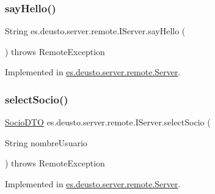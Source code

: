 \mbox{\label{interfacees_1_1deusto_1_1server_1_1remote_1_1_i_server_a9a2ee16746baf359dc7ac1fc4437eee8}} 
\subsubsection{\texorpdfstring{sayHello()}{sayHello()}}
{\footnotesize\ttfamily String es.\+deusto.\+server.\+remote.\+I\+Server.\+say\+Hello (\begin{DoxyParamCaption}{ }\end{DoxyParamCaption}) throws Remote\+Exception}



Implemented in \mbox{\hyperlink{classes_1_1deusto_1_1server_1_1remote_1_1_server_a37ccd2be0b3fbf0a80b356f132eca048}{es.\+deusto.\+server.\+remote.\+Server}}.

\mbox{\label{interfacees_1_1deusto_1_1server_1_1remote_1_1_i_server_a5268c08f2dd59d8ebc3864f7345c12f3}} 
\subsubsection{\texorpdfstring{selectSocio()}{selectSocio()}}
{\footnotesize\ttfamily \mbox{\hyperlink{classes_1_1deusto_1_1server_1_1dto_1_1_socio_d_t_o}{Socio\+D\+TO}} es.\+deusto.\+server.\+remote.\+I\+Server.\+select\+Socio (\begin{DoxyParamCaption}\item[{String}]{nombre\+Usuario }\end{DoxyParamCaption}) throws Remote\+Exception}



Implemented in \mbox{\hyperlink{classes_1_1deusto_1_1server_1_1remote_1_1_server_ab26aaf2d539feae12e21a4f6328886a4}{es.\+deusto.\+server.\+remote.\+Server}}.

\mbox{\label{interfacees_1_1deusto_1_1server_1_1remote_1_1_i_server_a585b4e8eb577808d6b7f0b47d0f7b724}} 
